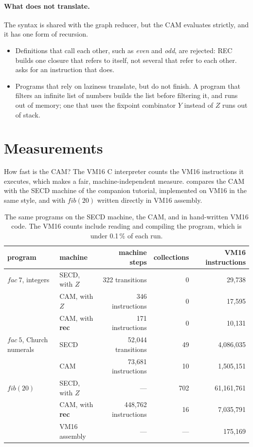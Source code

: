 \documentclass[11pt,a4paper]{article}
\newcommand{\ins}[1]{\textsf{#1}}
\theoremstyle{definition}
\theoremstyle{plain}
\begin{document}
\paragraph{What does not translate.} The syntax is shared with the graph
reducer, but the CAM evaluates strictly, and it has one form of recursion.
\begin{itemize}[nosep]
\item Definitions that call each other, such as \textit{even} and
  \textit{odd}, are rejected: \ins{REC} builds one closure that refers to
  itself, not several that refer to each other.
   asks for an instruction that does.
\item Programs that rely on laziness translate, but do not finish. A program
  that filters an infinite list of numbers builds the list before filtering
  it, and runs out of memory; one that uses the fixpoint combinator $Y$
  instead of $Z$ runs out of stack.
\end{itemize}

\section{Measurements}\label{sec:measure}

How fast is the CAM? The VM16 C interpreter counts the VM16 instructions it
executes, which makes a fair, machine-independent measure.
 compares the CAM with the SECD machine of the companion
tutorial, implemented on VM16 in the same style, and with
$\mathit{fib}(20)$ written directly in VM16 assembly.

\begin{table}[t]
\centering
\small
\begin{tabular}{@{}l l r r r@{}}
\toprule
program & machine & machine steps & collections & VM16 instructions\\
\midrule
$\mathit{fac}\ 7$, integers & SECD, with $Z$ & 322 transitions & 0 & 29,738\\
 & CAM, with $Z$ & 346 instructions & 0 & 17,595\\
 & CAM, with \textbf{rec} & 171 instructions & 0 & 10,131\\
\midrule
$\mathit{fac}\ 5$, Church numerals & SECD & 52,044 transitions & 49 & 4,086,035\\
 & CAM & 73,681 instructions & 10 & 1,505,151\\
\midrule
$\mathit{fib}(20)$ & SECD, with $Z$ & --- & 702 & 61,161,761\\
 & CAM, with \textbf{rec} & 448,762 instructions & 16 & 7,035,791\\
 & VM16 assembly & --- & --- & 175,169\\
\bottomrule
\end{tabular}
\caption{The same programs on the SECD machine, the CAM, and in hand-written
VM16 code. The VM16 counts include reading and compiling the program, which
is under 0.1\,\% of each run.}
\label{tab:measure}
\end{table}
\end{document}
